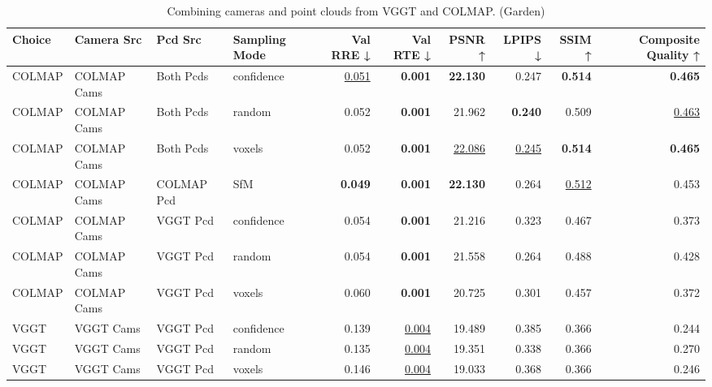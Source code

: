 \begin{table}[H]
\caption{\ifdefined\customcaption \customcaption \else Combining cameras and point clouds from VGGT and COLMAP. (Garden) \fi}
\label{tab:07_combined_single_garden}
\centering
\tiny
\begin{tabular}{llllrrrrrr}
\toprule
Choice & Camera Src & Pcd Src & Sampling Mode & Val RRE ↓ & Val RTE ↓ & PSNR ↑ & LPIPS ↓ & SSIM ↑ & Composite Quality ↑ \\
\midrule
COLMAP & COLMAP Cams & Both Pcds & confidence & \underline{0.051} & \textbf{0.001} & \textbf{22.130} & 0.247 & \textbf{0.514} & \textbf{0.465} \\
COLMAP & COLMAP Cams & Both Pcds & random & 0.052 & \textbf{0.001} & 21.962 & \textbf{0.240} & 0.509 & \underline{0.463} \\
COLMAP & COLMAP Cams & Both Pcds & voxels & 0.052 & \textbf{0.001} & \underline{22.086} & \underline{0.245} & \textbf{0.514} & \textbf{0.465} \\
COLMAP & COLMAP Cams & COLMAP Pcd & SfM & \textbf{0.049} & \textbf{0.001} & \textbf{22.130} & 0.264 & \underline{0.512} & 0.453 \\
COLMAP & COLMAP Cams & VGGT Pcd & confidence & 0.054 & \textbf{0.001} & 21.216 & 0.323 & 0.467 & 0.373 \\
COLMAP & COLMAP Cams & VGGT Pcd & random & 0.054 & \textbf{0.001} & 21.558 & 0.264 & 0.488 & 0.428 \\
COLMAP & COLMAP Cams & VGGT Pcd & voxels & 0.060 & \textbf{0.001} & 20.725 & 0.301 & 0.457 & 0.372 \\
VGGT & VGGT Cams & VGGT Pcd & confidence & 0.139 & \underline{0.004} & 19.489 & 0.385 & 0.366 & 0.244 \\
VGGT & VGGT Cams & VGGT Pcd & random & 0.135 & \underline{0.004} & 19.351 & 0.338 & 0.366 & 0.270 \\
VGGT & VGGT Cams & VGGT Pcd & voxels & 0.146 & \underline{0.004} & 19.033 & 0.368 & 0.366 & 0.246 \\
\bottomrule
\end{tabular}
\end{table}